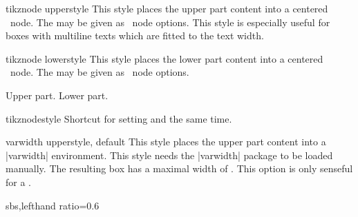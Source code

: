 \clearpage
\begin{docTcbKey}{tikznode upper}{}{style}
  This style places the upper part content into a centered
  \tikzname\  node. The  may be given as \tikzname\  node options.
  This style is especially useful for boxes with multiline texts which are
  fitted to the text width.
\end{docTcbKey}

\begin{docTcbKey}{tikznode lower}{}{style}
  This style places the lower part content into a centered
  \tikzname\ node. The  may be given as \tikzname\  node options.
\begin{dispExample}
\begin{tcolorbox}[bicolor,colback=LightBlue!50!white,colbacklower=white,
  colframe=black,tikznode lower={inner sep=2pt,draw=red,fill=yellow}]
Upper part.
\tcblower
Lower part.
\end{tcolorbox}
\end{dispExample}
\end{docTcbKey}

\begin{docTcbKey}{tikznode}{}{style}
  Shortcut for setting  and 
  the same time.
\end{docTcbKey}


\begin{docTcbKey}{varwidth upper}{}{style, default }
  This style places the upper part content into a |varwidth| environment.
  This style needs the |varwidth| package \cite{arseneau:2011a} to be loaded manually.
  The resulting box has a maximal width of .
  This option is only senseful for a .
\begin{dispExample*}{sbs,lefthand ratio=0.6}

\end{dispExample*}
\end{docTcbKey}



